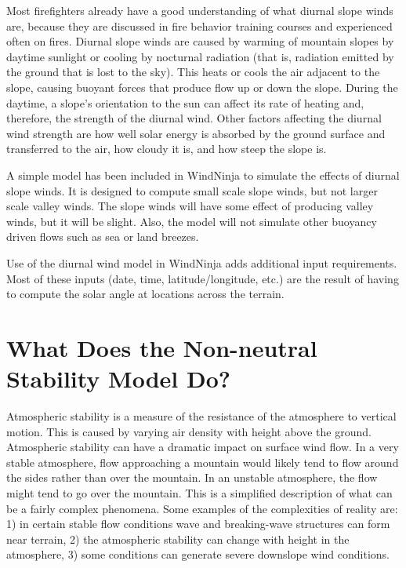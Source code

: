 \documentclass[12pt]{article}
\begin{document}
Most firefighters already have a good understanding of what diurnal slope winds are, because they are discussed in fire behavior training courses and experienced often on fires.  Diurnal slope winds are caused by warming of mountain slopes by daytime sunlight or cooling by nocturnal radiation (that is, radiation emitted by the  ground that is lost to the  sky).  This heats or cools the air adjacent to the slope, causing buoyant forces that produce flow up or down the slope.  During the daytime, a slope’s orientation to the sun can affect its rate of heating and, therefore, the strength of the diurnal wind.  Other factors affecting the diurnal wind strength are how well solar energy is absorbed by the ground surface and transferred to the air, how cloudy it is, and how steep the slope is.

A simple model has been included in WindNinja to simulate the effects of diurnal slope winds.  It is designed to compute small scale slope winds, but not larger scale valley winds.  The slope winds will have some effect of producing valley winds, but it will be slight.  Also, the model will not simulate other buoyancy driven flows such as sea or land breezes.

Use of the diurnal wind model in WindNinja adds additional input requirements.  Most of these inputs (date, time, latitude/longitude, etc.) are the result of having to compute the solar angle at locations across the terrain.

\section*{What Does the Non-neutral Stability Model Do?}

Atmospheric stability is a measure of the resistance of the atmosphere to vertical motion.  This is caused by varying air density with height above the ground.  Atmospheric stability can have a dramatic impact on surface wind flow.  In a very stable atmosphere, flow approaching a mountain would likely tend to flow around the sides rather than over the mountain.  In an unstable atmosphere, the flow might tend to go over the mountain.  This is a simplified description of what can be a fairly complex phenomena.  Some examples of the complexities of reality are:  1) in certain stable flow conditions wave and breaking-wave structures can form near terrain, 2) the atmospheric stability can change with height in the atmosphere, 3) some conditions can generate severe downslope wind conditions.
\end{document}
